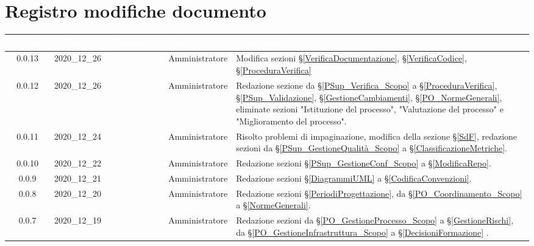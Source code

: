 \section*{Registro modifiche documento}
{
\renewcommand{\arraystretch}{1.5}
\centering
\begin{longtable}{ c c  C{2.3cm} C{3cm} C{3.2cm}}


 \textcolor{white}{\textbf{Versione}}&
    \textcolor{white}{\textbf{Data}}&
    \textcolor{white}{\textbf{Nominativo}}&
    \textcolor{white}{\textbf{Ruolo}}&
    \textcolor{white}{\textbf{Descrizione}}\\	
    \endhead
    
    0.0.13 & 2020\_12\_26 & \TG{}  & Amministratore & Modifica sezioni \S\ref{VerificaDocumentazione}, \S\ref{VerificaCodice}, \S\ref{ProceduraVerifica} \\
    
      0.0.12 & 2020\_12\_26 & \TG{}  & Amministratore & Redazione sezione da \S\ref{PSup_Verifica_Scopo} a \S\ref{ProceduraVerifica}, \S\ref{PSup_Validazione}, \S\ref{GestioneCambiamenti}, \S\ref{PO_NormeGenerali}, eliminate sezioni "Istituzione del processo", "Valutazione del processo" e "Miglioramento del processo". \\
    
     0.0.11 & 2020\_12\_24 & \TG{}  & Amministratore & Risolto problemi di impaginazione, modifica della sezione \S\ref{SdF}, redazione sezioni da \S\ref{PSup_GestioneQualità_Scopo} a \S\ref{ClassificazioneMetriche}. \\
    
     0.0.10 & 2020\_12\_22 & \TG{}  & Amministratore & Redazione sezioni \S\ref{PSup_GestioneConf_Scopo} a \S\ref{ModificaRepo}. \\
    
    0.0.9 & 2020\_12\_21 & \TG{}  & Amministratore & Redazione sezioni \S\ref{DiagrammiUML} a \S\ref{CodificaConvenzioni}. \\
    
    0.0.8 & 2020\_12\_20 & \TG{}  & Amministratore & Redazione sezioni \S\ref{PeriodiProgettazione}, da \S\ref{PO_Coordinamento_Scopo} a \S\ref{NormeGenerali}. \\
    
     0.0.7 & 2020\_12\_19 & \TG{}  & Amministratore & Redazione sezioni da \S\ref{PO_GestioneProcesso_Scopo} a \S\ref{GestioneRischi}, da \S\ref{PO_GestioneInfrastruttura_Scopo} a \S\ref{DecisioniFormazione} . \\
    

\end{longtable}}
